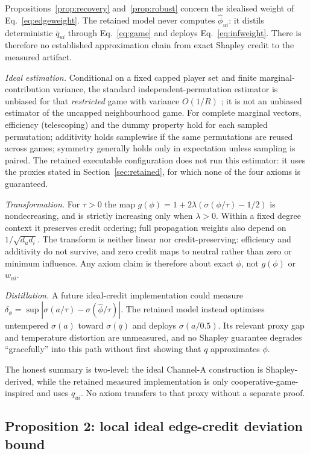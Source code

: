 \documentclass[a4paper,fleqn,longmktitle]{cas-dc}
\begin{document}
Propositions~\ref{prop:recovery} and~\ref{prop:robust} concern the idealised
weight of Eq.~\eqref{eq:edgeweight}. The retained model never computes
$\hat\phi_{ui}$: it distils deterministic $\bar q_{ui}$ through
Eq.~\eqref{eq:game} and deploys Eq.~\eqref{eq:infweight}. There is therefore no
established approximation chain from exact Shapley credit to the measured
artifact.

\emph{Ideal estimation.} Conditional on a fixed capped player set and
finite marginal-contribution variance, the standard independent-permutation
estimator is unbiased for that \emph{restricted} game with variance
$O(1/R)$ \citep{castro2009polynomial}; it is not an unbiased estimator of the
uncapped neighbourhood game. For complete marginal vectors, efficiency
(telescoping) and the dummy property hold for each sampled permutation;
additivity holds samplewise if the same permutations are reused across games;
symmetry generally holds only in expectation unless sampling is paired. The
retained executable configuration does not run this estimator: it uses the
proxies stated in Section~\ref{sec:retained}, for which none of the four axioms
is guaranteed.

\emph{Transformation.} For $\tau>0$ the map
$g(\phi)=1+2\lambda(\sigma(\phi/\tau)-1/2)$ is nondecreasing, and is strictly
increasing only when $\lambda>0$. Within a fixed degree context it preserves
credit ordering; full propagation weights also depend on
$1/\sqrt{d_ud_i}$. The transform is neither linear nor credit-preserving:
efficiency and additivity do not survive, and zero credit maps to neutral
rather than zero or minimum influence. Any axiom claim is therefore about
exact $\phi$, not $g(\phi)$ or $w_{ui}$.

\emph{Distillation.} A future ideal-credit implementation could measure
$\delta_\phi=\sup|\sigma(a/\tau)-\sigma(\hat\phi/\tau)|$. The retained model
instead optimises untempered $\sigma(a)$ toward $\sigma(\bar q)$ and deploys
$\sigma(a/0.5)$. Its relevant proxy gap and temperature distortion are
unmeasured, and no Shapley guarantee degrades ``gracefully'' into this path
without first showing that $q$ approximates $\phi$.

The honest summary is two-level: the ideal Channel-A construction is
Shapley-derived, while the retained measured implementation is only
cooperative-game-inspired and uses $q_{ui}$. No axiom transfers to that proxy
without a separate proof.

\subsection{Proposition 2: local ideal edge-credit deviation bound}
\label{sec:prop2}
\end{document}
